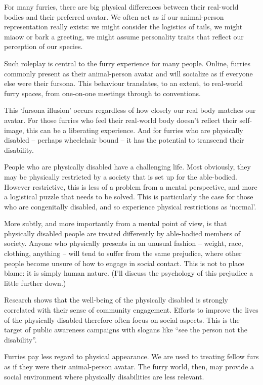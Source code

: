 
For many furries, there are big physical differences between their real-world bodies and their preferred avatar. We often act as if our animal-person representation really exists: we might consider the logistics of tails, we might miaow or bark a greeting, we might assume personality traits that reflect our perception of our species.

Such roleplay is central to the furry experience for many people. Online, furries commonly present as their animal-person avatar and will socialize as if everyone else were their fursona. This behaviour translates, to an extent, to real-world furry spaces, from one-on-one meetings through to conventions.

This `fursona illusion' occurs regardless of how closely our real body matches our avatar. For those furries who feel their real-world body doesn't reflect their self-image, this can be a liberating experience. And for furries who are physically disabled -- perhaps wheelchair bound -- it has the potential to transcend their disability.

People who are physically disabled have a challenging life. Most obviously, they may be physically restricted by a society that is set up for the able-bodied. However restrictive, this is less of a problem from a mental perspective, and more a logistical puzzle that needs to be solved. This is particularly the case for those who are congenitally disabled, and so experience physical restrictions as `normal'.

More subtly, and more importantly from a mental point of view, is that physically disabled people are treated differently by able-bodied members of society. Anyone who physically presents in an unusual fashion -- weight, race, clothing, anything -- will tend to suffer from the same prejudice, where other people become unsure of how to engage in social contact. This is not to place blame: it is simply human nature. (I'll discuss the psychology of this prejudice a little further down.)

Research shows that the well-being of the physically disabled is strongly correlated with their sense of community engagement. Efforts to improve the lives of the physically disabled therefore often focus on social aspects. This is the target of public awareness campaigns with slogans like ``see the person not the disability''.

Furries pay less regard to physical appearance. We are used to treating fellow furs as if they were their animal-person avatar. The furry world, then, may provide a social environment where physically disabilities are less relevant.

